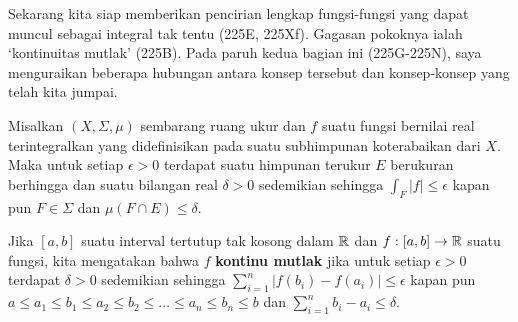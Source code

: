 
\def\chaptername{Teorema Dasar Kalkulus}
\def\sectionname{Fungsi kontinu mutlak}


Sekarang kita siap memberikan pencirian lengkap fungsi-fungsi yang dapat
muncul sebagai integral tak tentu (225E, 225Xf). Gagasan pokoknya ialah
`kontinuitas mutlak' (225B). Pada paruh kedua bagian ini (225G-225N), saya
menguraikan beberapa hubungan antara konsep tersebut dan konsep-konsep yang
telah kita jumpai.

 Misalkan $(X,\Sigma,\mu)$ sembarang ruang ukur dan
$f$ suatu fungsi bernilai real terintegralkan yang didefinisikan pada suatu
subhimpunan koterabaikan dari $X$. Maka untuk setiap $\epsilon>0$ terdapat
suatu himpunan terukur $E$ berukuran berhingga dan suatu bilangan real
$\delta>0$ sedemikian sehingga $\int_F|f|\le\epsilon$ kapan pun
$F\in\Sigma$ dan $\mu(F\cap E)\le\delta$.


Jika $[a,b]$ suatu interval tertutup tak kosong dalam $\Bbb R$ dan
$f:[a,b]\to\Bbb R$ suatu fungsi, kita mengatakan bahwa $f$ {\bf kontinu
mutlak} jika untuk setiap $\epsilon>0$ terdapat $\delta>0$ sedemikian sehingga
$\sum_{i=1}^n|f(b_i)-f(a_i)|\le\epsilon$ kapan pun
$a\le a_1\le b_1\le a_2\le b_2\le\ldots\le a_n\le b_n\le b$ dan
$\sum_{i=1}^nb_i-a_i\le\delta$.

